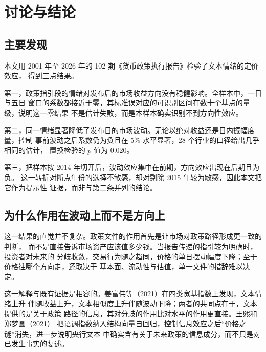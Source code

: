 
\section{讨论与结论}

\subsection{主要发现}

本文用 2001 年至 2026 年的 102 期《货币政策执行报告》检验了文本情绪的定价效应，
得到三点结果。

第一，政策指引段的情绪对发布后的市场收益方向没有稳健影响。全样本中，一日与五日
窗口的系数都接近于零，其标准误对应的可识别区间在数十个基点的量级，说明这一零结果
不是估计失败，而是本样本确实识别不到方向性效应。

第二，同一情绪显著降低了发布日的市场波动。无论以绝对收益还是日内振幅度量，控制
事前波动之后系数仍为负且在 5\% 水平显著，28 个行业的口径给出几乎相同的估计，
置换检验的 $p$ 值为 0.020。

第三，把样本按 2014 年切开后，波动效应集中在前期，方向效应出现在后期且为负。
这一转折对断点年份的选择不敏感，却对剔除 2015 年较为敏感，因此本文把它作为提示性
证据，而非与第二条并列的结论。

\subsection{为什么作用在波动上而不是方向上}

这一结果的直觉并不复杂。政策文件的作用首先是让市场对政策路径形成更一致的判断，
而不是直接告诉市场资产应该值多少钱。当报告传递的指引较为明确时，投资者对未来的
分歧收敛，交易行为随之趋同，价格的单日摆动幅度下降；至于价格往哪个方向走，还取决于
基本面、流动性与估值，单一文件的措辞难以决定。

这一解释与既有证据是相容的。姜富伟等（2021）在四类宽基指数上发现，文本情绪上升
伴随收益上升，文本相似度上升伴随波动下降；两者的共同点在于，文本提供的是关于政策
路径的信息，其对分歧的作用比对水平的作用更直接。王熙和郑梦圆（2021）
把语调指数纳入结构向量自回归，控制信息效应之后“价格之谜”消失，进一步说明央行文本
中确实含有关于未来政策的信息成分，而不只是对已发生事实的复述。

